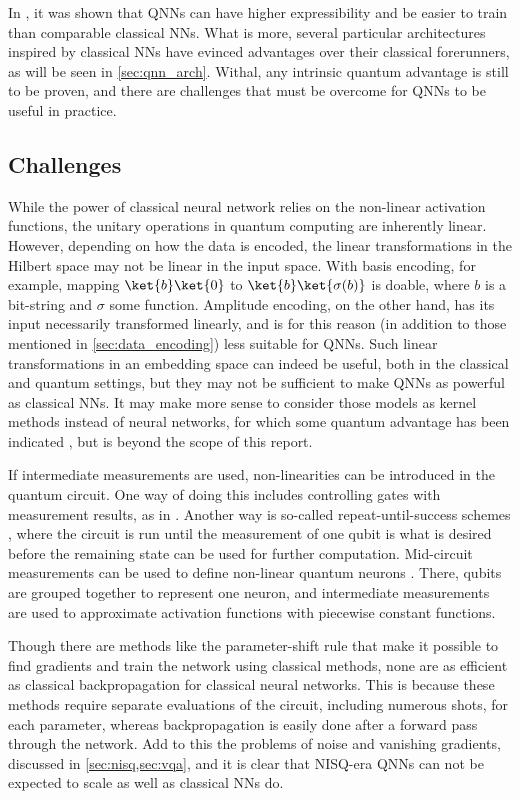 In \cite{abbas2021}, it was shown that QNNs can have higher expressibility and be easier to train than comparable classical NNs.
What is more, several particular architectures inspired by classical NNs have evinced advantages over their classical forerunners, as will be seen in \cref{sec:qnn_arch}.
Withal, any intrinsic quantum advantage is still to be proven, and there are challenges that must be overcome for QNNs to be useful in practice.

\subsection{Challenges}
While the power of classical neural network relies on the non-linear activation functions, the unitary operations in quantum computing are inherently linear.
However, depending on how the data is encoded, the linear transformations in the Hilbert space may not be linear in the input space.
With basis encoding, for example, mapping $\ket{b}\ket{0}$ to $\ket{b}\ket{\sigma(b)}$ is doable, where $b$ is a bit-string and $\sigma$ some function.
Amplitude encoding, on the other hand, has its input necessarily transformed linearly, and is for this reason (in addition to those mentioned in \cref{sec:data_encoding}) less suitable for QNNs.
Such linear transformations in an embedding space can indeed be useful, both in the classical and quantum settings, but they may not be sufficient to make QNNs as powerful as classical NNs.
It may make more sense to consider those models as kernel methods instead of neural networks, for which some quantum advantage has been indicated \cite{schuld2019a}, but is beyond the scope of this report.

If intermediate measurements are used, non-linearities can be introduced in the quantum circuit.
One way of doing this includes controlling gates with measurement results, as in \cite{cong2019}.
Another way is so-called repeat-until-success schemes \cite{cao2017}, where the circuit is run until the measurement of one qubit is what is desired before the remaining state can be used for further computation.
Mid-circuit measurements can be used to define non-linear quantum neurons \cite{yan2020}.
There, qubits are grouped together to represent one neuron, and intermediate measurements are used to approximate activation functions with piecewise constant functions.

Though there are methods like the parameter-shift rule that make it possible to find gradients and train the network using classical methods, none are as efficient as classical backpropagation for classical neural networks.
This is because these methods require separate evaluations of the circuit, including numerous shots, for each parameter, whereas backpropagation is easily done after a forward pass through the network.
Add to this the problems of noise and vanishing gradients, discussed in \cref{sec:nisq,sec:vqa}, and it is clear that NISQ-era QNNs can not be expected to scale as well as classical NNs do.


